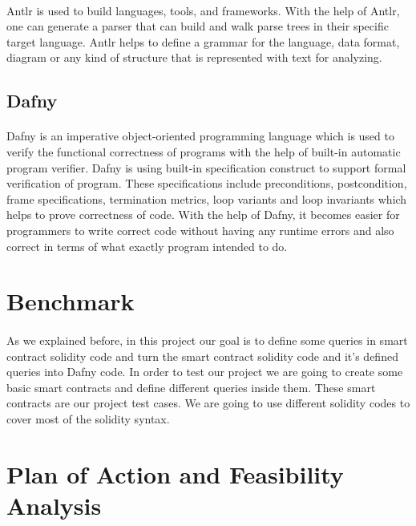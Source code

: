 \documentclass[11pt]{article}
\begin{document}
\paragraph{}
Antlr is used to build languages, tools, and frameworks. With the help of Antlr, one can generate a parser that can build and walk parse trees in their specific target language. Antlr helps to define a grammar for the language, data format, diagram or any kind of structure that is represented with text for analyzing.


\subsection{Dafny}
\paragraph{}
Dafny is an imperative object-oriented programming language which is used to verify the functional correctness of programs with the help of built-in automatic program verifier. Dafny is using built-in specification construct to support formal verification of program. These specifications include preconditions, postcondition, frame specifications, termination metrics, loop variants and loop invariants which helps to prove correctness of code. With the help of Dafny, it becomes easier for programmers to write correct code without having any runtime errors and also correct in terms of what exactly program intended to do.


\section{Benchmark}
\paragraph{}
As we explained before, in this project our goal is to define some queries in smart contract solidity code and turn the smart contract solidity code and it's defined queries into Dafny code. In order to test our project we are going to create some basic smart contracts and define different queries inside them. These smart contracts are our project test cases. We are going to use different solidity codes to cover most of the solidity syntax.   

\section{Plan of Action and Feasibility Analysis}
\end{document}
